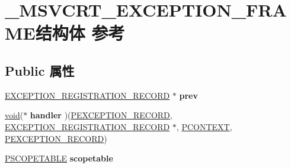 \hypertarget{struct___m_s_v_c_r_t___e_x_c_e_p_t_i_o_n___f_r_a_m_e}{}\section{\+\_\+\+M\+S\+V\+C\+R\+T\+\_\+\+E\+X\+C\+E\+P\+T\+I\+O\+N\+\_\+\+F\+R\+A\+M\+E结构体 参考}
\label{struct___m_s_v_c_r_t___e_x_c_e_p_t_i_o_n___f_r_a_m_e}
\subsection*{Public 属性}
\begin{DoxyCompactItemize}
\item 
\mbox{\label{struct___m_s_v_c_r_t___e_x_c_e_p_t_i_o_n___f_r_a_m_e_a691e89e8bc205ca36d3039a9f17b4fc7}} 
\hyperlink{struct___e_x_c_e_p_t_i_o_n___r_e_g_i_s_t_r_a_t_i_o_n___r_e_c_o_r_d}{E\+X\+C\+E\+P\+T\+I\+O\+N\+\_\+\+R\+E\+G\+I\+S\+T\+R\+A\+T\+I\+O\+N\+\_\+\+R\+E\+C\+O\+RD} $\ast$ {\bfseries prev}
\item 
\mbox{\label{struct___m_s_v_c_r_t___e_x_c_e_p_t_i_o_n___f_r_a_m_e_abc682f4bfe6eaec93729f4a653684814}} 
\hyperlink{interfacevoid}{void}($\ast$ {\bfseries handler} )(\hyperlink{struct___e_x_c_e_p_t_i_o_n___r_e_c_o_r_d}{P\+E\+X\+C\+E\+P\+T\+I\+O\+N\+\_\+\+R\+E\+C\+O\+RD}, \hyperlink{struct___e_x_c_e_p_t_i_o_n___r_e_g_i_s_t_r_a_t_i_o_n___r_e_c_o_r_d}{E\+X\+C\+E\+P\+T\+I\+O\+N\+\_\+\+R\+E\+G\+I\+S\+T\+R\+A\+T\+I\+O\+N\+\_\+\+R\+E\+C\+O\+RD} $\ast$, \hyperlink{struct___c_o_n_t_e_x_t}{P\+C\+O\+N\+T\+E\+XT}, \hyperlink{struct___e_x_c_e_p_t_i_o_n___r_e_c_o_r_d}{P\+E\+X\+C\+E\+P\+T\+I\+O\+N\+\_\+\+R\+E\+C\+O\+RD})
\item 
\mbox{\label{struct___m_s_v_c_r_t___e_x_c_e_p_t_i_o_n___f_r_a_m_e_a21f29a4f226e6a00316962e97d573a4c}} 
\hyperlink{struct___s_c_o_p_e_t_a_b_l_e}{P\+S\+C\+O\+P\+E\+T\+A\+B\+LE} {\bfseries scopetable}
\item 
\mbox{\label{struct___m_s_v_c_r_t___e_x_c_e_p_t_i_o_n___f_r_a_m_e_a0481dd23eb661073ebf9ee7ef6049952}} 

\end{DoxyCompactItemize}
